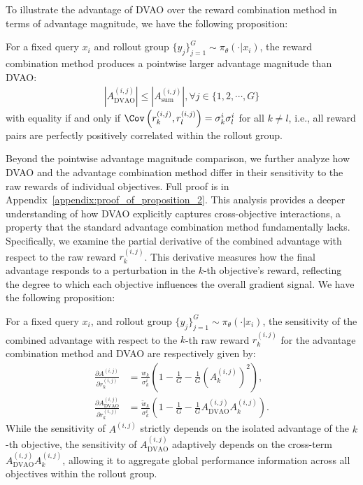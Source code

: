 To illustrate the advantage of DVAO over the reward combination method in terms of advantage magnitude, we have the following proposition:
\begin{proposition}
\label{proposition_2}
    For a fixed query $x_i$ and rollout group $\{y_j\}_{j=1}^G \sim \pi_\theta(\cdot | x_i)$, the reward combination method produces a pointwise larger advantage magnitude than DVAO:
    \begin{align}
        \left| A_\text{DVAO}^{(i,j)} \right| \le \left| A_\text{sum}^{(i,j)} \right|, \forall j \in \{1, 2, \cdots, G\}
    \end{align}
    with equality if and only if $\Cov\left(r_k^{(i,j)}, r_l^{(i,j)}\right) = \sigma_k^i \sigma_l^i$ for all $k \neq l$, i.e., all reward pairs are perfectly positively correlated within the rollout group.
\end{proposition}

Beyond the pointwise advantage magnitude comparison, we further analyze how DVAO and the advantage combination method differ in their sensitivity to the raw rewards of individual objectives. Full proof is in Appendix~\ref{appendix:proof_of_proposition_2}. This analysis provides a deeper understanding of how DVAO explicitly captures cross-objective interactions, a property that the standard advantage combination method fundamentally lacks. Specifically, we examine the partial derivative of the combined advantage with respect to the raw reward $r_k^{(i,j)}$. This derivative measures how the final advantage responds to a perturbation in the $k$-th objective's reward, reflecting the degree to which each objective influences the overall gradient signal. We have the following proposition:
\begin{proposition}
\label{proposition_3}
    For a fixed query $x_i$, and rollout group $\{y_j\}_{j=1}^G \sim \pi_\theta(\cdot | x_i)$, the sensitivity of the combined advantage with  respect to the $k$-th raw reward $r_k^{(i,j)}$ for the advantage combination method and DVAO are respectively given by:
    \begin{align}
        \frac{\partial A^{(i,j)}}{\partial r_k^{(i,j)}} &= \frac{w_k}{\sigma_k^i} \left( 1 - \frac{1}{G} - \frac{1}{G} \left(A_k^{(i,j)}\right)^2 \right), \\
        \frac{\partial A_\text{DVAO}^{(i,j)}}{\partial r_k^{(i,j)}} &= \frac{\tilde{w}_k}{\sigma_k^i} \left( 1 - \frac{1}{G} - \frac{1}{G} A_\text{DVAO}^{(i,j)} A_k^{(i,j)} \right).
    \end{align}
    While the sensitivity of $A^{(i,j)}$ strictly depends on the isolated advantage of the $k$-th objective, the sensitivity of $A_\text{DVAO}^{(i,j)}$ adaptively depends on the cross-term $A_\text{DVAO}^{(i,j)} A_k^{(i,j)}$, allowing it to aggregate global performance information across all objectives within the rollout group.
\end{proposition}

